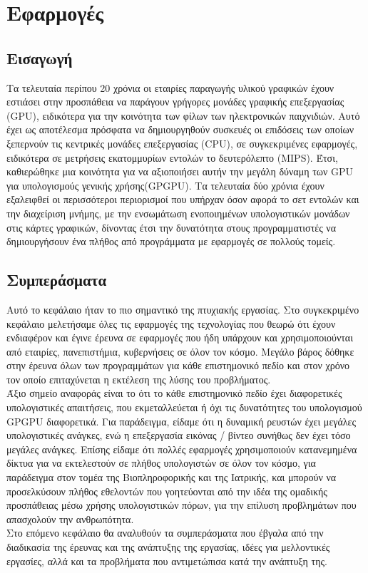 \chapter{Εφαρμογές}
\section{Εισαγωγή}
Τα τελευταία περίπου 20 χρόνια οι εταιρίες παραγωγής υλικού γραφικών έχουν εστιάσει στην προσπάθεια να παράγουν γρήγορες μονάδες γραφικής επεξεργασίας (GPU), ειδικότερα για την κοινότητα των φίλων των ηλεκτρονικών παιχνιδιών. Αυτό έχει ως αποτέλεσμα πρόσφατα να δημιουργηθούν συσκευές οι επιδόσεις των οποίων ξεπερνούν τις κεντρικές μονάδες επεξεργασίας (CPU), σε συγκεκριμένες εφαρμογές, ειδικότερα σε μετρήσεις εκατομμυρίων εντολών το δευτερόλεπτο (MIPS). Έτσι, καθιερώθηκε μια κοινότητα για να αξιοποιήσει αυτήν την μεγάλη δύναμη των GPU για υπολογισμούς γενικής χρήσης(GPGPU). Τα τελευταία δύο χρόνια έχουν εξαλειφθεί οι περισσότεροι περιορισμοί που υπήρχαν όσον αφορά το σετ εντολών και την διαχείριση μνήμης, με την ενσωμάτωση ενοποιημένων υπολογιστικών μονάδων στις κάρτες γραφικών, δίνοντας έτσι την δυνατότητα στους προγραμματιστές να δημιουργήσουν ένα πλήθος από προγράμματα με εφαρμογές σε πολλούς τομείς.










\section{Συμπεράσματα}
Αυτό το κεφάλαιο ήταν το πιο σημαντικό της πτυχιακής εργασίας. Στο συγκεκριμένο κεφάλαιο μελετήσαμε όλες τις εφαρμογές της τεχνολογίας που θεωρώ ότι έχουν ενδιαφέρον και έγινε έρευνα σε εφαρμογές που ήδη υπάρχουν και χρησιμοποιούνται από εταιρίες, πανεπιστήμια, κυβερνήσεις σε όλον τον κόσμο. Μεγάλο βάρος δόθηκε στην έρευνα όλων των προγραμμάτων για κάθε επιστημονικό πεδίο και στον χρόνο τον οποίο επιταχύνεται η εκτέλεση της λύσης του προβλήματος.\\

Άξιο σημείο αναφοράς είναι το ότι το κάθε επιστημονικό πεδίο έχει διαφορετικές υπολογιστικές απαιτήσεις, που εκμεταλλεύεται ή όχι τις δυνατότητες του υπολογισμού GPGPU διαφορετικά. Για παράδειγμα, είδαμε ότι η δυναμική ρευστών έχει μεγάλες υπολογιστικές ανάγκες, ενώ η επεξεργασία εικόνας / βίντεο συνήθως δεν έχει τόσο μεγάλες ανάγκες. Επίσης είδαμε ότι πολλές εφαρμογές χρησιμοποιούν κατανεμημένα δίκτυα για να εκτελεστούν σε πλήθος υπολογιστών σε όλον τον κόσμο, για παράδειγμα στον τομέα της Βιοπληροφορικής και της Ιατρικής, και μπορούν να προσελκύσουν πλήθος εθελοντών που γοητεύονται από την ιδέα της ομαδικής προσπάθειας μέσω χρήσης υπολογιστικών πόρων, για την επίλυση προβλημάτων που απασχολούν την ανθρωπότητα.\\

Στο επόμενο κεφάλαιο θα αναλυθούν τα συμπεράσματα που έβγαλα από την διαδικασία της έρευνας και της ανάπτυξης της εργασίας, ιδέες για μελλοντικές εργασίες, αλλά και τα προβλήματα που αντιμετώπισα κατά την ανάπτυξη της.